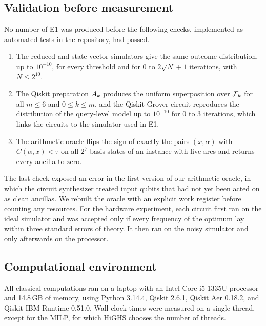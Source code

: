 \subsection{Validation before measurement}\label{sec:method-validation}
No number of E1 was produced before the following checks, implemented as automated tests in the repository, had passed.
\begin{enumerate}
\item The reduced and state-vector simulators give the same outcome distribution, up to $10^{-10}$, for every threshold and for $0$ to $2\sqrt{N}+1$ iterations, with $N\le 2^{10}$.
\item The Qiskit preparation $A_k$ produces the uniform superposition over $\mathcal{F}_k$ for all $m\le 6$ and $0\le k\le m$, and the Qiskit Grover circuit reproduces the distribution of the query-level model up to $10^{-10}$ for $0$ to $3$ iterations, which links the circuits to the simulator used in E1.
\item The arithmetic oracle flips the sign of exactly the pairs $(x,\alpha)$ with $C(\alpha,x)<\tau$ on all $2^{7}$ basis states of an instance with five arcs and returns every ancilla to zero.
\end{enumerate}
The last check exposed an error in the first version of our arithmetic oracle, in which the circuit synthesizer treated input qubits that had not yet been acted on as clean ancillas. We rebuilt the oracle with an explicit work register before counting any resources. For the hardware experiment, each circuit first ran on the ideal simulator and was accepted only if every frequency of the optimum lay within three standard errors of theory. It then ran on the noisy simulator and only afterwards on the processor.

\subsection{Computational environment}
All classical computations ran on a laptop with an Intel Core i5-1335U processor and 14.8\,GB of memory, using Python 3.14.4, Qiskit 2.6.1, Qiskit Aer 0.18.2, and Qiskit IBM Runtime 0.51.0. Wall-clock times were measured on a single thread, except for the MILP, for which HiGHS chooses the number of threads.
